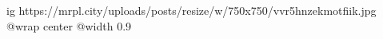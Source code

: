  
 
 
 
 

\ifcmt
  ig https://mrpl.city/uploads/posts/resize/w/750x750/vvr5hnzekmotfiik.jpg
  @wrap center
  @width 0.9
\fi
